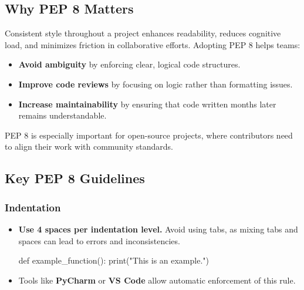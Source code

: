 \documentclass[
  letterpaper,
  DIV=11,
  numbers=noendperiod]{scrreprt}
\newenvironment{Shaded}{\begin{snugshade}}{\end{snugshade}}
\newcommand{\BuiltInTok}[1]{\textcolor[rgb]{0.00,0.23,0.31}{#1}}
\newcommand{\KeywordTok}[1]{\textcolor[rgb]{0.00,0.23,0.31}{#1}}
\newcommand{\NormalTok}[1]{\textcolor[rgb]{0.00,0.23,0.31}{#1}}
\newcommand{\StringTok}[1]{\textcolor[rgb]{0.13,0.47,0.30}{#1}}
\providecommand{\tightlist}{%
  \setlength{\itemsep}{0pt}\setlength{\parskip}{0pt}}\usepackage{longtable,booktabs,array}
\begin{document}
\hypertarget{why-pep-8-matters}{%
\subsection{Why PEP 8 Matters}\label{why-pep-8-matters}}

Consistent style throughout a project enhances readability, reduces
cognitive load, and minimizes friction in collaborative efforts.
Adopting PEP 8 helps teams:

\begin{itemize}
\tightlist
\item
  \textbf{Avoid ambiguity} by enforcing clear, logical code structures.
\item
  \textbf{Improve code reviews} by focusing on logic rather than
  formatting issues.
\item
  \textbf{Increase maintainability} by ensuring that code written months
  later remains understandable.
\end{itemize}

PEP 8 is especially important for open-source projects, where
contributors need to align their work with community standards.

\hypertarget{key-pep-8-guidelines}{%
\subsection{Key PEP 8 Guidelines}\label{key-pep-8-guidelines}}

\hypertarget{indentation}{%
\subsubsection{Indentation}\label{indentation}}

\begin{itemize}
\item
  \textbf{Use 4 spaces per indentation level.} Avoid using tabs, as
  mixing tabs and spaces can lead to errors and inconsistencies.

\begin{Shaded}
\begin{Highlighting}[]
\KeywordTok{def}\NormalTok{ example\_function():}
    \BuiltInTok{print}\NormalTok{(}\StringTok{"This is an example."}\NormalTok{)}
\end{Highlighting}
\end{Shaded}
\item
  Tools like \textbf{PyCharm} or \textbf{VS Code} allow automatic
  enforcement of this rule.
\end{itemize}
\end{document}
